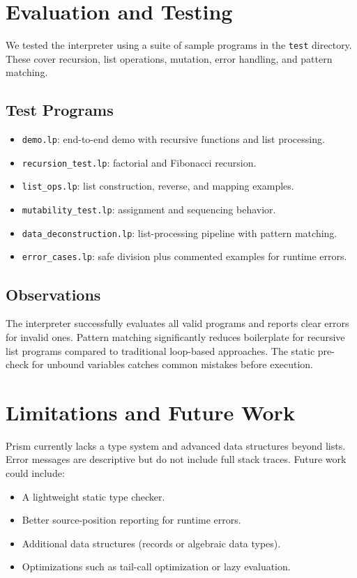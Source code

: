\documentclass[11pt]{article}
\begin{document}
\section{Evaluation and Testing}
We tested the interpreter using a suite of sample programs in the \texttt{test} directory. These cover recursion, list operations, mutation, error handling, and pattern matching.

\subsection{Test Programs}
\begin{itemize}[leftmargin=1.2em]
  \item \texttt{demo.lp}: end-to-end demo with recursive functions and list processing.
  \item \texttt{recursion\_test.lp}: factorial and Fibonacci recursion.
  \item \texttt{list\_ops.lp}: list construction, reverse, and mapping examples.
  \item \texttt{mutability\_test.lp}: assignment and sequencing behavior.
  \item \texttt{data\_deconstruction.lp}: list-processing pipeline with pattern matching.
  \item \texttt{error\_cases.lp}: safe division plus commented examples for runtime errors.
\end{itemize}

\subsection{Observations}
The interpreter successfully evaluates all valid programs and reports clear errors for invalid ones. Pattern matching significantly reduces boilerplate for recursive list programs compared to traditional loop-based approaches. The static pre-check for unbound variables catches common mistakes before execution.

\section{Limitations and Future Work}
Prism currently lacks a type system and advanced data structures beyond lists. Error messages are descriptive but do not include full stack traces. Future work could include:
\begin{itemize}[leftmargin=1.2em]
  \item A lightweight static type checker.
  \item Better source-position reporting for runtime errors.
  \item Additional data structures (records or algebraic data types).
  \item Optimizations such as tail-call optimization or lazy evaluation.
\end{itemize}
\end{document}
